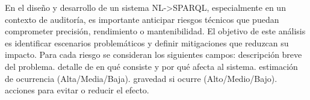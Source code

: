 {}\markdownRendererInterblockSeparator
{}En el diseño y desarrollo de un sistema NL->SPARQL, especialmente en un contexto de auditoría, es importante anticipar riesgos técnicos que puedan comprometer precisión, rendimiento o mantenibilidad. El objetivo de este análisis es identificar escenarios problemáticos y definir mitigaciones que reduzcan su impacto.\markdownRendererInterblockSeparator
{}Para cada riesgo se consideran los siguientes campos:\markdownRendererInterblockSeparator
{}\markdownRendererUlBeginTight
\markdownRendererUlItem {} descripción breve del problema.\markdownRendererUlItemEnd 
\markdownRendererUlItem {} detalle de en qué consiste y por qué afecta al sistema.\markdownRendererUlItemEnd 
\markdownRendererUlItem {} estimación de ocurrencia (Alta/Media/Baja).\markdownRendererUlItemEnd 
\markdownRendererUlItem {} gravedad si ocurre (Alto/Medio/Bajo).\markdownRendererUlItemEnd 
\markdownRendererUlItem {} acciones para evitar o reducir el efecto.\markdownRendererUlItemEnd 
\markdownRendererUlEndTight \markdownRendererInterblockSeparator
{}\markdownRendererInterblockSeparator
